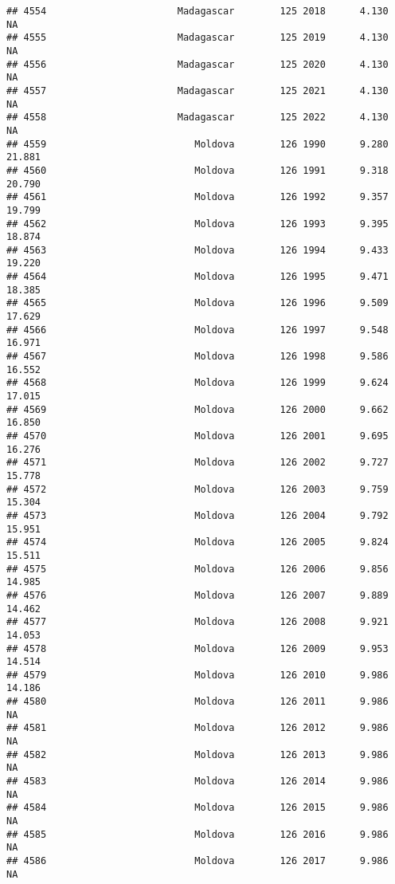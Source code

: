 \documentclass[
]{article}
\begin{document}
\begin{verbatim}
## 4554                       Madagascar        125 2018      4.130         NA
## 4555                       Madagascar        125 2019      4.130         NA
## 4556                       Madagascar        125 2020      4.130         NA
## 4557                       Madagascar        125 2021      4.130         NA
## 4558                       Madagascar        125 2022      4.130         NA
## 4559                          Moldova        126 1990      9.280     21.881
## 4560                          Moldova        126 1991      9.318     20.790
## 4561                          Moldova        126 1992      9.357     19.799
## 4562                          Moldova        126 1993      9.395     18.874
## 4563                          Moldova        126 1994      9.433     19.220
## 4564                          Moldova        126 1995      9.471     18.385
## 4565                          Moldova        126 1996      9.509     17.629
## 4566                          Moldova        126 1997      9.548     16.971
## 4567                          Moldova        126 1998      9.586     16.552
## 4568                          Moldova        126 1999      9.624     17.015
## 4569                          Moldova        126 2000      9.662     16.850
## 4570                          Moldova        126 2001      9.695     16.276
## 4571                          Moldova        126 2002      9.727     15.778
## 4572                          Moldova        126 2003      9.759     15.304
## 4573                          Moldova        126 2004      9.792     15.951
## 4574                          Moldova        126 2005      9.824     15.511
## 4575                          Moldova        126 2006      9.856     14.985
## 4576                          Moldova        126 2007      9.889     14.462
## 4577                          Moldova        126 2008      9.921     14.053
## 4578                          Moldova        126 2009      9.953     14.514
## 4579                          Moldova        126 2010      9.986     14.186
## 4580                          Moldova        126 2011      9.986         NA
## 4581                          Moldova        126 2012      9.986         NA
## 4582                          Moldova        126 2013      9.986         NA
## 4583                          Moldova        126 2014      9.986         NA
## 4584                          Moldova        126 2015      9.986         NA
## 4585                          Moldova        126 2016      9.986         NA
## 4586                          Moldova        126 2017      9.986         NA

\end{verbatim}
\end{document}
